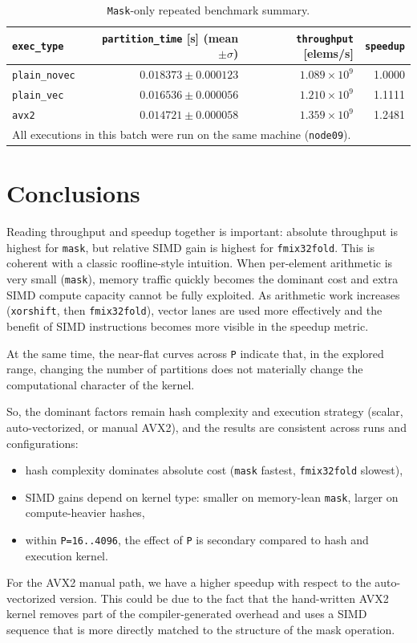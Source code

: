 \documentclass[11pt,a4paper]{article}
\begin{document}
\begin{table}[H]
    \centering
    \begin{tabular}{lrrr}
        \toprule
        \texttt{exec\_type} & \texttt{partition\_time} [s] (mean $\pm \sigma$) & \texttt{throughput} [elems/s] & \texttt{speedup} \\
        \midrule
        \texttt{plain\_novec} & $0.018373 \pm 0.000123$ & $1.089 \times 10^9$ & 1.0000 \\
        \texttt{plain\_vec}   & $0.016536 \pm 0.000056$ & $1.210 \times 10^9$ & 1.1111 \\
        \texttt{avx2}         & $0.014721 \pm 0.000058$ & $1.359 \times 10^9$ & 1.2481 \\
        \midrule
        \multicolumn{4}{l}{All executions in this batch were run on the same machine (\texttt{node09}).} \\
        \bottomrule
    \end{tabular}
    \caption{\texttt{Mask}-only repeated benchmark summary.}
    \label{tab:exec-summary}
\end{table}


\section{Conclusions}
Reading throughput and speedup together is important: absolute throughput is highest for \texttt{mask}, but relative SIMD gain is highest for \texttt{fmix32fold}. This is coherent with a classic roofline-style intuition. When per-element arithmetic is very small (\texttt{mask}), memory traffic quickly becomes the dominant cost and extra SIMD compute capacity cannot be fully exploited. As arithmetic work increases (\texttt{xorshift}, then \texttt{fmix32fold}), vector lanes are used more effectively and the benefit of SIMD instructions becomes more visible in the speedup metric.

At the same time, the near-flat curves across \texttt{P} indicate that, in the explored range, changing the number of partitions does not materially change the computational character of the kernel.

So, the dominant factors remain hash complexity and execution strategy (scalar, auto-vectorized, or manual AVX2), and the results are consistent across runs and configurations:
\begin{itemize}
    \item hash complexity dominates absolute cost (\texttt{mask} fastest, \texttt{fmix32fold} slowest),
    \item SIMD gains depend on kernel type: smaller on memory-lean \texttt{mask}, larger on compute-heavier hashes,
    \item within \texttt{P=16..4096}, the effect of \texttt{P} is secondary compared to hash and execution kernel.
\end{itemize}

For the AVX2 manual path, we have a higher speedup with respect to the auto-vectorized version. This could be due to the fact that the hand-written AVX2 kernel removes part of the compiler-generated overhead and uses a SIMD sequence that is more directly matched to the structure of the mask operation.
\end{document}
